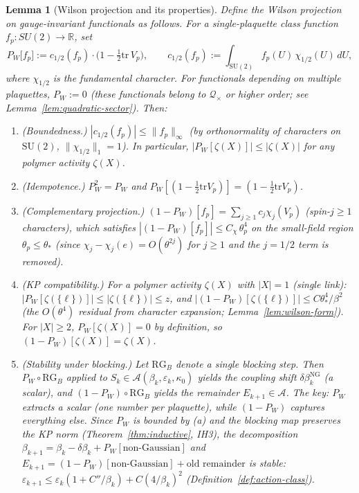 \documentclass[11pt]{article}
\newtheorem{lemma}[theorem]{Lemma}
\theoremstyle{definition}
\newcommand{\SU}{\mathrm{SU}}
\newcommand{\tr}{\mathrm{tr}}
\newcommand{\R}{\mathbb{R}}
\begin{document}
\begin{lemma}[Wilson projection and its properties]%
\label{lem:wilson-proj}
Define the \emph{Wilson projection} on gauge-invariant
functionals as follows.  For a single-plaquette class function
$f_p:SU(2)\to\R$, set
\begin{equation}\label{eq:wilson-proj}
P_W\bigl[f_p\bigr]
:=c_{1/2}(f_p)\cdot\bigl(1-\tfrac{1}{2}\tr\,V_p\bigr),
\qquad
c_{1/2}(f_p)
:=\int_{\SU(2)}f_p(U)\,\chi_{1/2}(U)\,dU,
\end{equation}
where $\chi_{1/2}$ is the fundamental character.  For functionals
depending on multiple plaquettes, $P_W:=0$ (these functionals
belong to $\mathcal{Q}_\times$ or higher order;
see Lemma~\ref{lem:quadratic-sector}).
Then:
\begin{enumerate}[nosep,label=(\alph*)]
\item \emph{(Boundedness.)}
$|c_{1/2}(f_p)|\le\|f_p\|_\infty$ (by orthonormality
of characters on $\SU(2)$, $\|\chi_{1/2}\|_1=1$).
In particular, $|P_W[\zeta(X)]|\le|\zeta(X)|$ for
any polymer activity $\zeta(X)$.
\item \emph{(Idempotence.)}
$P_W^2=P_W$ and $P_W[(1-\frac{1}{2}\tr V_p)]=
(1-\frac{1}{2}\tr V_p)$.
\item \emph{(Complementary projection.)}
$(1-P_W)[f_p]=\sum_{j\ge 1}c_j\chi_j(V_p)$
(spin-$j\ge 1$ characters), which satisfies
$|(1-P_W)[f_p]|\le C_\chi\,\theta_p^4$ on the small-field
region $\theta_p\le\theta_*$ (since $\chi_j-\chi_j(e)
=O(\theta^{2j})$ for $j\ge 1$ and the $j=1/2$ term is
removed).
\item \emph{(KP compatibility.)}
For a polymer activity $\zeta(X)$ with $|X|=1$ (single link):
$|P_W[\zeta(\{\ell\})]|\le|\zeta(\{\ell\})|\le z$, and
$|(1-P_W)[\zeta(\{\ell\})]|\le C\theta_*^4/\beta^2$
(the $O(\theta^4)$ residual from character expansion;
Lemma~\ref{lem:wilson-form}).  For $|X|\ge 2$,
$P_W[\zeta(X)]=0$ by definition, so
$(1-P_W)[\zeta(X)]=\zeta(X)$.
\item \emph{(Stability under blocking.)}
Let $\mathrm{RG}_B$ denote a single blocking step.  Then
$P_W\circ\mathrm{RG}_B$ applied to $S_k\in\mathcal{A}(\beta_k,
\varepsilon_k,\kappa_0)$ yields the coupling shift
$\delta\beta_k^{\mathrm{NG}}$ (a scalar), and
$(1-P_W)\circ\mathrm{RG}_B$ yields the remainder
$E_{k+1}\in\mathcal{A}$.  The key: $P_W$ extracts a
\emph{scalar} (one number per plaquette), while
$(1-P_W)$ captures everything else.  Since $P_W$ is bounded
by (a) and the blocking map preserves the KP norm
(Theorem~\ref{thm:inductive}, IH3), the decomposition
$\beta_{k+1}=\beta_k-\delta\beta_k+P_W[\text{non-Gaussian}]$
and $E_{k+1}=(1-P_W)[\text{non-Gaussian}]+\text{old remainder}$
is stable: $\varepsilon_{k+1}\le\varepsilon_k(1+C''/\beta_k)
+C(4/\beta_k)^2$ (Definition~\ref{def:action-class}).
\end{enumerate}
\end{lemma}
\end{document}
